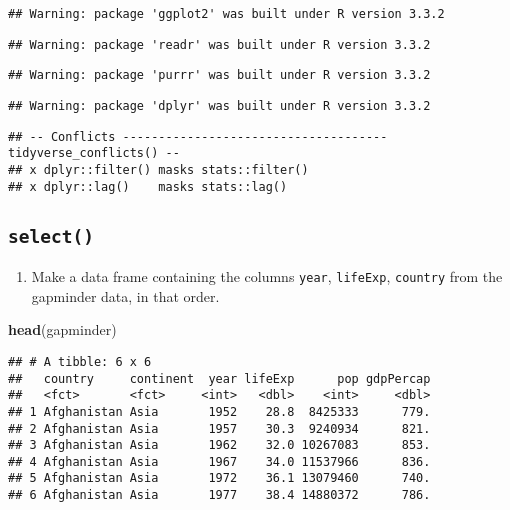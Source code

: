\documentclass[]{article}
\newenvironment{Shaded}{\begin{snugshade}}{\end{snugshade}}
\newcommand{\KeywordTok}[1]{\textcolor[rgb]{0.13,0.29,0.53}{\textbf{{#1}}}}
\newcommand{\NormalTok}[1]{{#1}}
\providecommand{\tightlist}{%
  \setlength{\itemsep}{0pt}\setlength{\parskip}{0pt}}
\begin{document}
\begin{verbatim}
## Warning: package 'ggplot2' was built under R version 3.3.2
\end{verbatim}

\begin{verbatim}
## Warning: package 'readr' was built under R version 3.3.2
\end{verbatim}

\begin{verbatim}
## Warning: package 'purrr' was built under R version 3.3.2
\end{verbatim}

\begin{verbatim}
## Warning: package 'dplyr' was built under R version 3.3.2
\end{verbatim}

\begin{verbatim}
## -- Conflicts ------------------------------------- tidyverse_conflicts() --
## x dplyr::filter() masks stats::filter()
## x dplyr::lag()    masks stats::lag()
\end{verbatim}

\subsection{\texorpdfstring{\texttt{select()}}{select()}}\label{select}

\begin{enumerate}
\def\labelenumi{\arabic{enumi}.}
\tightlist
\item
  Make a data frame containing the columns \texttt{year},
  \texttt{lifeExp}, \texttt{country} from the gapminder data, in that
  order.
\end{enumerate}

\begin{Shaded}
\begin{Highlighting}[]
\KeywordTok{head}\NormalTok{(gapminder)}
\end{Highlighting}
\end{Shaded}

\begin{verbatim}
## # A tibble: 6 x 6
##   country     continent  year lifeExp      pop gdpPercap
##   <fct>       <fct>     <int>   <dbl>    <int>     <dbl>
## 1 Afghanistan Asia       1952    28.8  8425333      779.
## 2 Afghanistan Asia       1957    30.3  9240934      821.
## 3 Afghanistan Asia       1962    32.0 10267083      853.
## 4 Afghanistan Asia       1967    34.0 11537966      836.
## 5 Afghanistan Asia       1972    36.1 13079460      740.
## 6 Afghanistan Asia       1977    38.4 14880372      786.
\end{verbatim}
\end{document}
